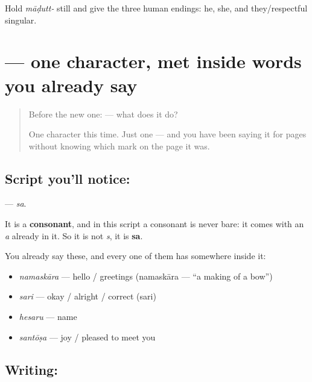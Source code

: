 \begin{tcolorbox}[breakable,colback=teal!4,colframe=teal!35!black,title={Before you move on}]
Hold \emph{māḍutt-} still and give the three human endings: he, she, and they/respectful singular.
\end{tcolorbox}
\section[\texorpdfstring{\kn{ಸ} (sa)}{ಸ (sa)}]{ — one character, met inside words you already say}

\label{lesson:KA-S121-letter-sa}



\begin{quote}
Before the new one:  — what does it do?

One character this time. Just one — and you have been saying it for pages without knowing which mark on the page it was.
\end{quote}

\subsection*{Script you'll notice: }
\textbf{} — \emph{sa}.

It is a \textbf{consonant}, and in this script a consonant is never bare: it comes with an \emph{a} already in it. So it is not \emph{s}, it is \textbf{sa}.

You already say these, and every one of them has  somewhere inside it:

\begin{itemize}
\raggedright
  \item \textbf{} \emph{namaskāra} — hello / greetings (namaskāra — \textquotedblleft{}a making of a bow\textquotedblright{})
  \item \textbf{} \emph{sari} — okay / alright / correct (sari)
  \item \textbf{} \emph{hesaru} — name
  \item \textbf{} \emph{santōṣa} — joy / pleased to meet you
\end{itemize}

\subsection*{Writing: }

